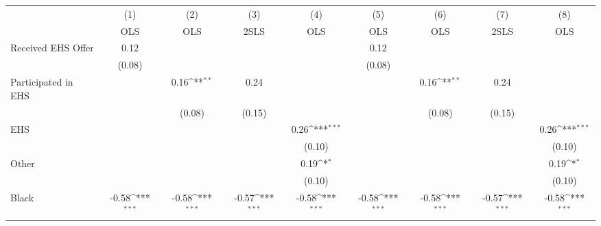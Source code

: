 {
\def\sym#1{\ifmmode^{#1}\else\(^{#1}\)\fi}
\begin{tabular}{l*{8}{c}}
\hline\hline
                    &\multicolumn{1}{c}{(1)}&\multicolumn{1}{c}{(2)}&\multicolumn{1}{c}{(3)}&\multicolumn{1}{c}{(4)}&\multicolumn{1}{c}{(5)}&\multicolumn{1}{c}{(6)}&\multicolumn{1}{c}{(7)}&\multicolumn{1}{c}{(8)}\\
                    &\multicolumn{1}{c}{OLS}&\multicolumn{1}{c}{OLS}&\multicolumn{1}{c}{2SLS}&\multicolumn{1}{c}{OLS}&\multicolumn{1}{c}{OLS}&\multicolumn{1}{c}{OLS}&\multicolumn{1}{c}{2SLS}&\multicolumn{1}{c}{OLS}\\
\hline
Received EHS Offer  &        0.12         &                     &                     &                     &        0.12         &                     &                     &                     \\
                    &      (0.08)         &                     &                     &                     &      (0.08)         &                     &                     &                     \\
[1em]
Participated in EHS &                     &        0.16\sym{**} &        0.24         &                     &                     &        0.16\sym{**} &        0.24         &                     \\
                    &                     &      (0.08)         &      (0.15)         &                     &                     &      (0.08)         &      (0.15)         &                     \\
[1em]
EHS                 &                     &                     &                     &        0.26\sym{***}&                     &                     &                     &        0.26\sym{***}\\
                    &                     &                     &                     &      (0.10)         &                     &                     &                     &      (0.10)         \\
[1em]
Other               &                     &                     &                     &        0.19\sym{*}  &                     &                     &                     &        0.19\sym{*}  \\
                    &                     &                     &                     &      (0.10)         &                     &                     &                     &      (0.10)         \\
[1em]
Black               &       -0.58\sym{***}&       -0.58\sym{***}&       -0.57\sym{***}&       -0.58\sym{***}&       -0.58\sym{***}&       -0.58\sym{***}&       -0.57\sym{***}&       -0.58\sym{***}\\

\end{tabular}}

